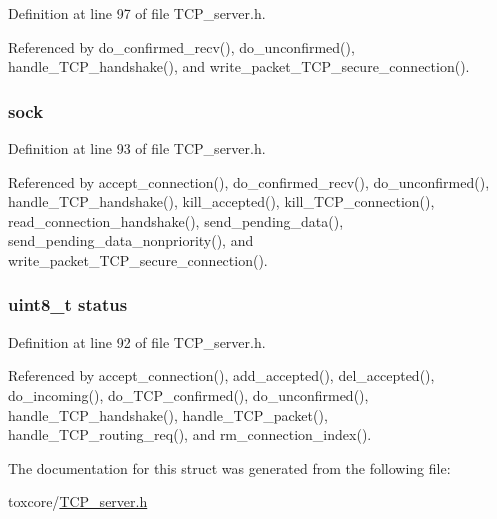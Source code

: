 Definition at line 97 of file T\+C\+P\+\_\+server.\+h.



Referenced by do\+\_\+confirmed\+\_\+recv(), do\+\_\+unconfirmed(), handle\+\_\+\+T\+C\+P\+\_\+handshake(), and write\+\_\+packet\+\_\+\+T\+C\+P\+\_\+secure\+\_\+connection().

\hypertarget{struct_t_c_p___secure___connection_a35b19d84fb632ca8ce5cab237f7089a5}{
\subsubsection[{sock}]{ sock}}\label{struct_t_c_p___secure___connection_a35b19d84fb632ca8ce5cab237f7089a5}


Definition at line 93 of file T\+C\+P\+\_\+server.\+h.



Referenced by accept\+\_\+connection(), do\+\_\+confirmed\+\_\+recv(), do\+\_\+unconfirmed(), handle\+\_\+\+T\+C\+P\+\_\+handshake(), kill\+\_\+accepted(), kill\+\_\+\+T\+C\+P\+\_\+connection(), read\+\_\+connection\+\_\+handshake(), send\+\_\+pending\+\_\+data(), send\+\_\+pending\+\_\+data\+\_\+nonpriority(), and write\+\_\+packet\+\_\+\+T\+C\+P\+\_\+secure\+\_\+connection().

\hypertarget{struct_t_c_p___secure___connection_ade818037fd6c985038ff29656089758d}{
\subsubsection[{status}]{\setlength{\rightskip}{0pt plus 5cm}uint8\+\_\+t status}}\label{struct_t_c_p___secure___connection_ade818037fd6c985038ff29656089758d}


Definition at line 92 of file T\+C\+P\+\_\+server.\+h.



Referenced by accept\+\_\+connection(), add\+\_\+accepted(), del\+\_\+accepted(), do\+\_\+incoming(), do\+\_\+\+T\+C\+P\+\_\+confirmed(), do\+\_\+unconfirmed(), handle\+\_\+\+T\+C\+P\+\_\+handshake(), handle\+\_\+\+T\+C\+P\+\_\+packet(), handle\+\_\+\+T\+C\+P\+\_\+routing\+\_\+req(), and rm\+\_\+connection\+\_\+index().



The documentation for this struct was generated from the following file\+:\begin{DoxyCompactItemize}
\item 
toxcore/\hyperlink{_t_c_p__server_8h}{T\+C\+P\+\_\+server.\+h}\end{DoxyCompactItemize}
